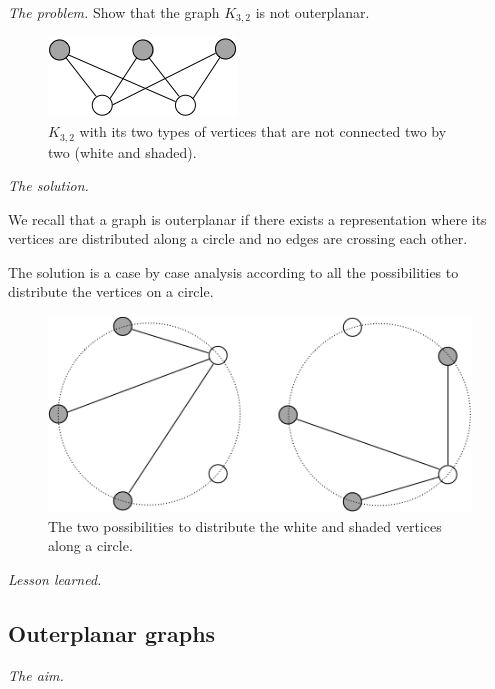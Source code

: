 \noindent \textit{The problem.}
Show that the graph $K_{3,2}$ is not outerplanar.
\begin{figure}[h]
\begin{center}
        \includegraphics[scale=0.4]{FiguresGraph/outerplanarK3,2init}
        \caption{$K_{3,2}$ with its two types of vertices that are not connected two by two (white and shaded).}
\end{center}
\end{figure}
\medskip

\noindent \textit{The solution.}

We recall that a graph is outerplanar if there exists a representation where its vertices are distributed along a circle 
and no edges are crossing each other.

The solution is a case by case analysis according to all the possibilities to distribute the vertices on a circle.
\begin{figure}[h]
\begin{center}
        \includegraphics[scale=0.4]{FiguresGraph/outerplanarK3,2}
        \caption{The two possibilities to distribute the white and shaded vertices along a circle.}
\end{center}
\end{figure}

\medskip

\noindent \textit{Lesson learned.}


\subsection{Outerplanar graphs}

\noindent \textit{The aim.}

